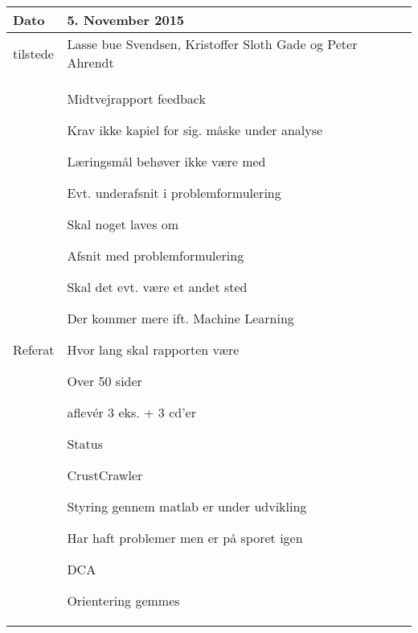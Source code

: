 \begin{center}
	\begin{tabular}{| l | p{10cm} |}
		\hline
		Dato		& 5. November 2015\\ \hline
		tilstede 	& Lasse bue Svendsen, Kristoffer Sloth Gade og Peter Ahrendt\\ \hline
		Referat		& \vspace{-5mm}\begin{myEnumerate}
			\item Midtvejrapport feedback
			\begin{myItemize}				
				\item Krav ikke kapiel for sig. måske under analyse
				\item Læringsmål behøver ikke være med
				\begin{myItemize}
					\item Evt. underafsnit i problemformulering
				\end{myItemize}
				\item Skal noget laves om
				\begin{myItemize}
					\item Afsnit med problemformulering
					\begin{myItemize}
						\item Skal det evt. være et andet sted
					\end{myItemize}
					\item Der kommer mere ift. Machine Learning
				\end{myItemize}
				\item Hvor lang skal rapporten være
				\begin{myItemize}
					\item Over 50 sider
					\item aflevér 3 eks. + 3 cd'er
				\end{myItemize}
			\end{myItemize}
			\item Status
			\begin{myItemize}
				\item CrustCrawler
				\begin{myItemize}
					\item Styring gennem matlab er under udvikling
					\item Har haft problemer men er på sporet igen
				\end{myItemize}
				\item DCA
				\begin{myItemize}
					\item Orientering gemmes

\end{myItemize}
\end{myItemize}
\end{myEnumerate}
\end{tabular}
\end{center}
